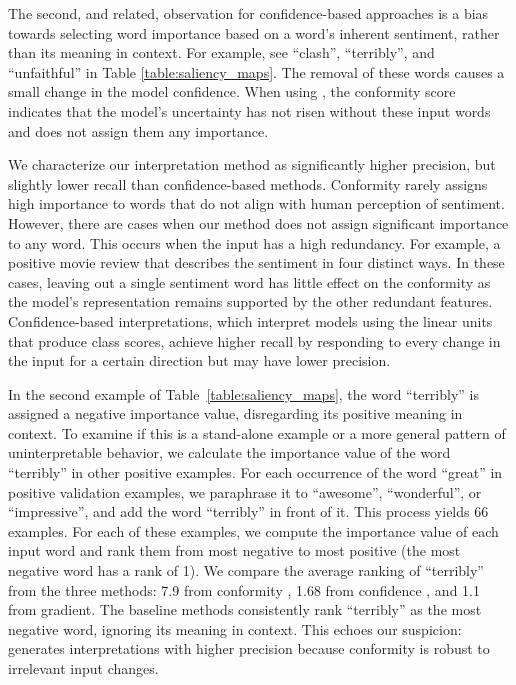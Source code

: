 The second, and related, observation for confidence-based approaches is a bias
towards selecting word importance based on a word's inherent sentiment,
rather than its meaning in context. For example, see ``clash'',
``terribly'', and ``unfaithful'' in Table \ref{table:saliency_maps}.
The removal of these words causes a small change in the model confidence.
When using \dknn{}, the conformity score indicates that the model's
uncertainty has not risen without these input words and \loo{} does not
assign them any importance.

We characterize our interpretation method as significantly
higher precision, but slightly lower recall than confidence-based
methods. Conformity \loo{} rarely assigns high importance to words
that do not align with
human perception of sentiment. However, there are cases when our
method does not assign significant importance to any word. This occurs
when the input has a high redundancy. For example, a positive movie
review that describes the sentiment in four distinct ways. In these
cases, leaving out a single sentiment word has little effect on the
conformity as the model's representation remains supported by the
other redundant features. Confidence-based interpretations, which
interpret models using the linear units that produce class scores,
achieve higher recall by responding to every change in the input for a
certain direction but may have lower precision.

In the second example of Table~\ref{table:saliency_maps}, the word ``terribly''
is assigned a negative importance value, disregarding its positive meaning in context.
To examine if this is a stand-alone example or a more general pattern of 
uninterpretable behavior, we calculate the importance value of the word
``terribly'' in other positive examples. For each occurrence of the word ``great''
in positive validation examples, we paraphrase it to ``awesome'', ``wonderful'',
or ``impressive'', and add the word ``terribly'' in front of it. 
This process yields $66$ examples. For each of these examples,
we compute the importance value of each input word and rank them from
most negative to most positive (the most negative word has
a rank of 1). We compare the average ranking of ``terribly''
from the three methods: 7.9 from conformity \loo{}, 1.68 from confidence \loo{}, and 1.1 from
gradient. The baseline methods consistently rank ``terribly'' as the most
negative word, ignoring its meaning in context. This echoes our suspicion: \dknn{} generates
interpretations with higher precision because conformity is robust to irrelevant input changes.



